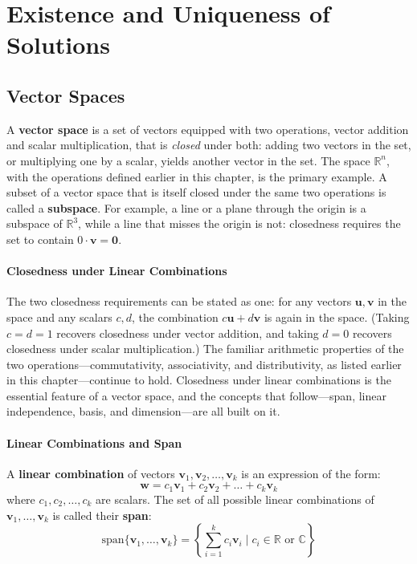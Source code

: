 \section{Existence and Uniqueness of Solutions}

\subsection{Vector Spaces}\label{sec:vector-space}
A \textbf{vector space} is a set of vectors equipped with two operations, vector addition and scalar multiplication, that is \emph{closed} under both: adding two vectors in the set, or multiplying one by a scalar, yields another vector in the set.
The space $\mathbb{R}^n$, with the operations defined earlier in this chapter, is the primary example.
A subset of a vector space that is itself closed under the same two operations is called a \textbf{subspace}.
For example, a line or a plane through the origin is a subspace of $\mathbb{R}^3$, while a line that misses the origin is not: closedness requires the set to contain $0 \cdot \mathbf{v} = \mathbf{0}$.

\paragraph*{Closedness under Linear Combinations}
The two closedness requirements can be stated as one: for any vectors $ \mathbf{u}, \mathbf{v} $ in the space and any scalars $ c, d $, the combination $ c\mathbf{u} + d\mathbf{v} $ is again in the space.
(Taking $ c = d = 1 $ recovers closedness under vector addition, and taking $ d = 0 $ recovers closedness under scalar multiplication.)
The familiar arithmetic properties of the two operations---commutativity, associativity, and distributivity, as listed earlier in this chapter---continue to hold.
Closedness under linear combinations is the essential feature of a vector space, and the concepts that follow---span, linear independence, basis, and dimension---are all built on it.

\paragraph*{Linear Combinations and Span}
A \textbf{linear combination} of vectors $ \mathbf{v}_1, \mathbf{v}_2, \ldots, \mathbf{v}_k $ is an expression of the form:
\begin{equation*}
    \mathbf{w} = c_1 \mathbf{v}_1 + c_2 \mathbf{v}_2 + \ldots + c_k \mathbf{v}_k
\end{equation*}
where $ c_1, c_2, \ldots, c_k $ are scalars. The set of all possible linear combinations of $ \mathbf{v}_1, \ldots, \mathbf{v}_k $ is called their \textbf{span}:
\begin{equation*}
    \text{span}\{\mathbf{v}_1, \ldots, \mathbf{v}_k\} = \left\{ \sum_{i=1}^k c_i \mathbf{v}_i \mid c_i \in \mathbb{R} \text{ or } \mathbb{C} \right\}
\end{equation*}

